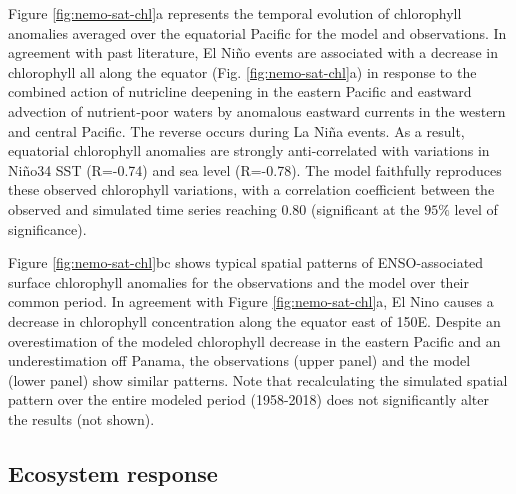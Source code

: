 Figure \ref{fig:nemo-sat-chl}a represents the temporal evolution of chlorophyll anomalies averaged over the equatorial Pacific for the model and observations. In agreement with past literature, El Niño events are associated with a decrease in chlorophyll all along the equator (Fig. \ref{fig:nemo-sat-chl}a) in response to the combined action of nutricline deepening in the eastern Pacific and eastward advection of nutrient‐poor waters by anomalous eastward currents in the western and central Pacific. The reverse occurs during La Niña events. As a result, equatorial chlorophyll anomalies are strongly anti-correlated with variations in Niño34 SST (R=-0.74) and sea level (R=-0.78). The model faithfully reproduces these observed chlorophyll variations, with a correlation coefficient between the observed and simulated time series reaching $0.80$ (significant at the $95\%$ level of significance).

Figure \ref{fig:nemo-sat-chl}bc shows typical spatial patterns of ENSO-associated surface chlorophyll anomalies for the observations and the model over their common period. In agreement with Figure \ref{fig:nemo-sat-chl}a, El Nino causes a decrease in chlorophyll concentration along the equator east of 150\degree{}E. Despite an overestimation of the modeled chlorophyll decrease in the eastern Pacific and an underestimation off Panama, the observations (upper panel) and the model (lower panel) show similar patterns. Note that recalculating the simulated spatial pattern over the entire modeled period (1958-2018) does not significantly alter the results (not shown). 

\subsection{Ecosystem response}

